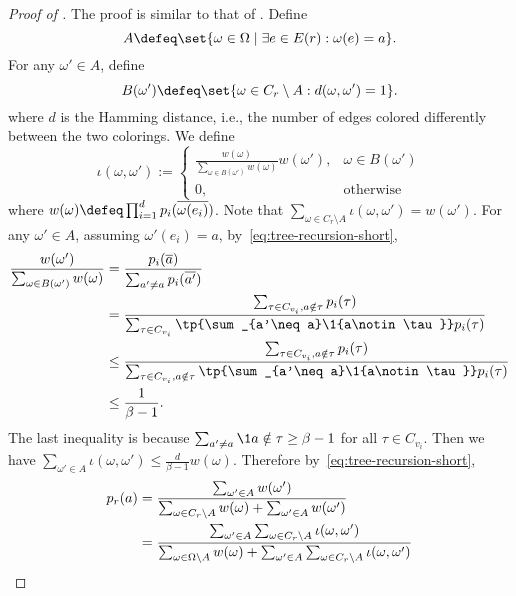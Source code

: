 \documentclass[a4paper,11pt]{article}
\begin{document}
    \begin{proof}[Proof of ] The proof is similar to that of .
    Define
\[A \defeq \set{\omega\in \Omega \mid \exists e\in E(r): \omega(e) = a}.\]
For any $\omega' \in A$, define
\[
    B(\omega')\defeq \set{\omega\in C_r\setminus A : d(\omega, \omega') = 1}.
\]
where $d$ is the Hamming distance, i.e., the number of edges colored differently between the two colorings.
        We define
        $$
            \iota(\omega,\omega') := \begin{cases}
                \frac{w(\omega)}{\sum_{\omega\in B(\omega')}w(\omega)}w(\omega'),&\omega\in B(\omega')
                \\ 0,& \text{otherwise}
            \end{cases}
        $$
        where $w(\omega) \defeq \prod_{i=1}^{d} \*p_i(\overline{\omega(e_i)})$. Note that $\sum_{\omega \in C_r\setminus A} \iota(\omega,\omega')=w(\omega')$.
        For any $\omega' \in A$, assuming $\omega'(e_i) = a$, by~\eqref{eq:tree-recursion-short},
        \begin{align*}
            \frac{w(\omega')}{\sum_{\omega\in B(\omega')} w(\omega)}
              &= \frac{\*p_i(\overline a)}{\sum_{a'\neq a} \*p_i(\overline{a'})}
            \\&= \frac{\sum_{\tau\in C_{v_i},a\notin \tau}\*p_i(\tau)}
              {\sum_{\tau\in C_{v_i}} \tp{\sum_{a'\neq a}\1{a\notin \tau}} \*p_i(\tau)}
            \\&\leq \frac{\sum_{\tau\in C_{v_i},a\notin \tau}\*p_i(\tau)}
              {\sum_{\tau\in C_{v_i}, a\notin\tau} \tp{\sum_{a'\neq a}\1{a\notin \tau}} \*p_i(\tau)}
            \\&\le \frac{1}{\beta-1}.
        \end{align*}
    The last inequality is because $\sum_{a'\neq a}\1{a\notin \tau}\ge \beta-1$ for all $\tau\in C_{v_i}$.
    Then we have $\sum_{\omega' \in A} \iota(\omega, \omega')\leq \frac{d}{\beta-1} w(\omega)$.    
    Therefore by~\eqref{eq:tree-recursion-short},
    \begin{align*}
\*p_r(a)
&= \frac{\sum_{\omega'\in A} w(\omega')}{\sum_{\omega\in C_r\setminus A} w(\omega) + \sum_{\omega'\in A} w(\omega')}\\
&= \frac{\sum_{\omega'\in A}\sum_{\omega\in C_r\setminus A} \iota(\omega, \omega')}
        {\sum_{\omega\in \Omega\setminus A} w(\omega) + \sum_{\omega'\in A}\sum_{\omega\in C_r\setminus A} \iota(\omega, \omega')}\\

\end{align*}
\end{proof}
\end{document}
